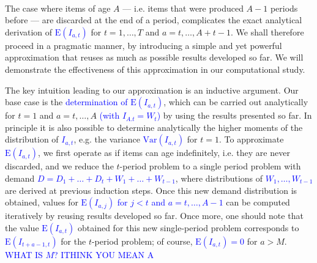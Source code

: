 \documentclass{tPRS2e}
\newcommand{\blue}{\textcolor{blue}}
\begin{document}
	\paragraph*{}
	The case where items of age $A$ --- i.e. items that were produced $A-1$ periods before --- are discarded at the end of a period, complicates the exact analytical derivation of \blue{$\mathrm{E}(I_{a,t})$} for $t=1,\ldots,T$ and $a=t,\ldots,A+t-1$. We shall therefore proceed in a pragmatic manner, by introducing a simple and yet powerful approximation that reuses as much as possible results developed so far. We will demonstrate the effectiveness of this approximation in our computational study.
	
	The key intuition leading to our approximation is an inductive argument. Our base case is the \blue{determination of $\mathrm{E}(I_{a,t})$}, which can be carried out analytically for $t=1$ and $a=t,\ldots,A$ \blue{(with $I_{A.t}=W_t$)} by using the results presented so far. In principle it is also possible to determine analytically the higher moments of the distribution of \blue{$I_{a,t}$}, e.g. the variance \blue{$\mathrm{Var}(I_{a,t})$} for $t=1$. To approximate \blue{$\mathrm{E}(I_{a,t})$}, we first operate as if items can age indefinitely, i.e. they are never discarded, and we reduce the $t$-period problem to a single period problem with demand \blue{$D=D_1+\ldots+D_t+W_{1}+\ldots+W_{t-1}$}, where distributions of \blue{$W_{1},\ldots,W_{t-1}$} are derived at previous induction steps. Once this new demand distribution is obtained, values for \blue{$\mathrm{E}(I_{a,j})$ for $j<t$ and $a=t,\ldots,A-1$} can be computed iteratively by reusing results developed so far. Once more, one should note that the value \blue{$\mathrm{E}(I_{a,t})$} obtained for this new single-period problem corresponds to \blue{$\mathrm{E}(I_{t+a-1,t})$} for the $t$-period problem; of course, \blue{$\mathrm{E}(I_{a,t})=0$} for $a>M$.	
	\blue{WHAT IS $M$? ITHINK YOU MEAN A}
	
\end{document}

